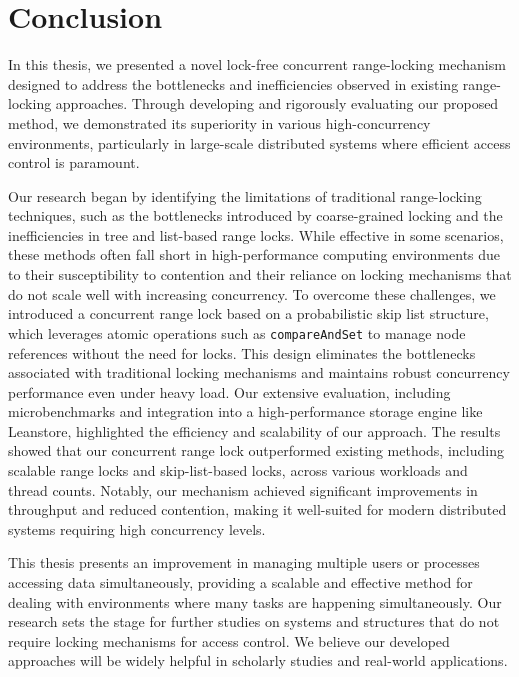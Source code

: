 
\chapter{Conclusion}\label{chapter:conclusion}

In this thesis, we presented a novel lock-free concurrent range-locking mechanism designed to address the bottlenecks and inefficiencies observed in existing range-locking approaches. Through developing and rigorously evaluating our proposed method, we demonstrated its superiority in various high-concurrency environments, particularly in large-scale distributed systems where efficient access control is paramount.

Our research began by identifying the limitations of traditional range-locking techniques, such as the bottlenecks introduced by coarse-grained locking and the inefficiencies in tree and list-based range locks. While effective in some scenarios, these methods often fall short in high-performance computing environments due to their susceptibility to contention and their reliance on locking mechanisms that do not scale well with increasing concurrency.
To overcome these challenges, we introduced a concurrent range lock based on a probabilistic skip list structure, which leverages atomic operations such as \texttt{compareAndSet} to manage node references without the need for locks. This design eliminates the bottlenecks associated with traditional locking mechanisms and maintains robust concurrency performance even under heavy load.
Our extensive evaluation, including microbenchmarks and integration into a high-performance storage engine like Leanstore, highlighted the efficiency and scalability of our approach. The results showed that our concurrent range lock outperformed existing methods, including scalable range locks and skip-list-based locks, across various workloads and thread counts. Notably, our mechanism achieved significant improvements in throughput and reduced contention, making it well-suited for modern distributed systems requiring high concurrency levels.

This thesis presents an improvement in managing multiple users or processes accessing data simultaneously, providing a scalable and effective method for dealing with environments where many tasks are happening simultaneously. Our research sets the stage for further studies on systems and structures that do not require locking mechanisms for access control. We believe our developed approaches will be widely helpful in scholarly studies and real-world applications.

